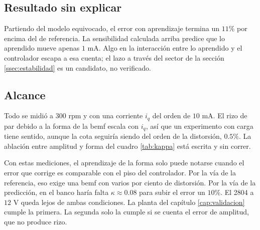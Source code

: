 \documentclass[../../../Tesis_JALS_Maestria.tex]{subfiles}
\begin{document}
\subsection{Resultado sin explicar}

Partiendo del modelo equivocado, el error con aprendizaje termina un $11\%$ por encima del de referencia. La sensibilidad calculada arriba predice que lo aprendido mueve apenas $1$ mA. Algo en la interacción entre lo aprendido y el controlador escapa a esa cuenta; el lazo a través del sector de la sección \ref{ssec:estabilidad} es un candidato, no verificado.

\subsection{Alcance}

Todo se midió a $300$ rpm y con una corriente $i_q$ del orden de $10$ mA. El rizo de par debido a la forma de la \acrshort{bemf} escala con $i_q$, así que un experimento con carga tiene sentido, aunque la cota seguiría siendo del orden de la distorsión, $0.5\%$. La ablación entre amplitud y forma del cuadro \ref{tab:kappa} está escrita y sin correr.

Con estas mediciones, el aprendizaje de la forma solo puede notarse cuando el error que corrige es comparable con el piso del controlador. Por la vía de la referencia, eso exige una \acrshort{bemf} con varios por ciento de distorsión. Por la vía de la predicción, en el banco haría falta $\kappa \approx 0.08$ para subir el error un $10\%$. El 2804 a $12$ V queda lejos de ambas condiciones. La planta del capítulo \ref{cap:validacion} cumple la primera. La segunda solo la cumple si se cuenta el error de amplitud, que no produce rizo.
\end{document}
